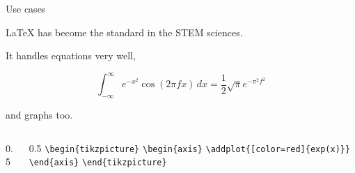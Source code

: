 \documentclass{beamer}
\newcommand{\command}[2]{\texttt{\textbackslash#1\{#2\}}}
\begin{document}
\begin{frame}{Use cases}

    \LaTeX{} has become the standard in the STEM sciences.

    \medskip

    It handles equations very well,

    \medskip
    {\rmfamily
        \begin{equation}
            \int_{-\infty}^{\infty} e^{-x^2} \cos(2\pi f x) \, dx = \frac{1}{2} \sqrt{\pi} e^{-\pi^2 f^2}
        \end{equation}
    }

    \medskip

    and graphs too.

    \medskip

    \begin{columns}
        \begin{column}{0.5\textwidth}
        \end{column}
        \begin{column}{0.5\textwidth}
            \ttfamily\small
            \command{begin}{tikzpicture}
            \quad\command{begin}{axis}
            \quad\quad\command{addplot}{[color=red]\{exp(x)\}}
            \quad\command{end}{axis}\newline
            \command{end}{tikzpicture}
        \end{column}
    \end{columns}
\end{frame}
\end{document}
